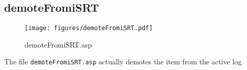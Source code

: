 \subsection{demoteFromiSRT}
\begin{figure}[htb]
    \begin{center}
        \texttt{[image: figures/demoteFromiSRT.pdf]}
    \end{center}
    \caption{demoteFromiSRT.asp}
    \label{fig:demoteFromiSRT}
\end{figure}

The file \verb|demoteFromiSRT.asp| actually demotes the item from the active
log.
